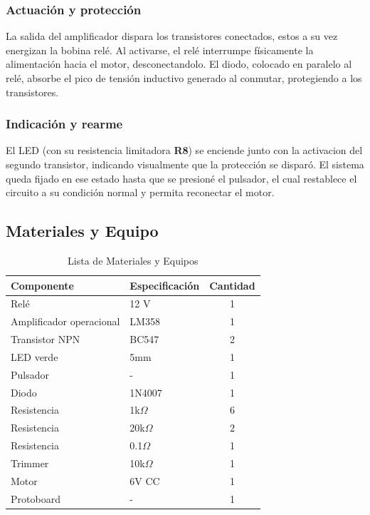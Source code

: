 \documentclass[conference]{IEEEtran}
\begin{document}
\subsubsection{\textbf{Actuación y protección\\}}
La salida del amplificador dispara los transistores conectados, estos a su vez energizan la bobina relé. Al activarse, el relé interrumpe físicamente la alimentación hacia el motor, desconectandolo. El diodo, colocado en paralelo al relé, absorbe el pico de tensión inductivo generado al conmutar, protegiendo a los transistores.

\subsubsection{\textbf{Indicación y rearme}}
El LED (con su resistencia limitadora \textbf{R8}) se enciende junto con la activacion del segundo transistor, indicando visualmente que la protección se disparó. El sistema queda fijado en ese estado hasta que se presioné el pulsador, el cual restablece el circuito a su condición normal y permita reconectar el motor.

\subsection{Materiales y Equipo}
	\begin{table}[h]
		\caption{Lista de Materiales y Equipos}
		\label{tab:materiales}
		\centering
		\begin{tabular}{l l c}
			\hline
			\textbf{Componente} & \textbf{Especificación} & \textbf{Cantidad} \\
			\hline
			Relé & 12 V & 1\\
			Amplificador operacional & LM358 & 1\\
			Transistor NPN & BC547 & 2\\
			LED verde & 5mm & 1\\
			Pulsador & - & 1\\
			Diodo & 1N4007 & 1\\
			Resistencia & 1k$\Omega$ & 6\\
			Resistencia & 20k$\Omega$ & 2\\
			Resistencia & 0.1$\Omega$ & 1\\
			Trimmer & 10k$\Omega$ & 1\\
			Motor & 6V CC & 1\\
			Protoboard & - & 1\\
			\hline
		\end{tabular}
	\end{table}
\end{document}
